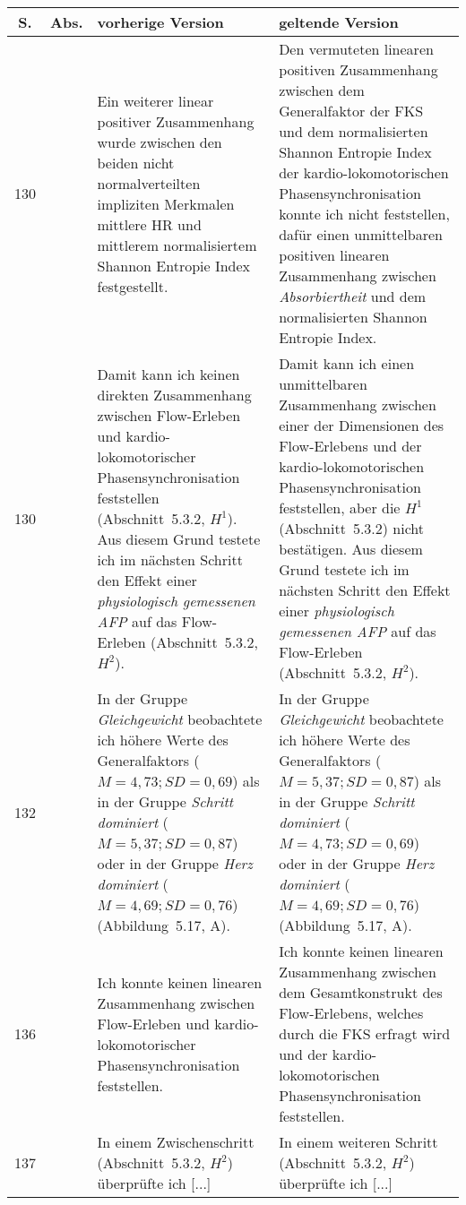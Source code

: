 \documentclass[12pt, twoside=semi, DIV=calc, pagesize, parskip=half, listof=totoc, bibliography=totoc, open=right, listof=nochaptergap, pointlessnumbers, final]{scrreprt}
\begin{document}
	\begin{tabularx}{\textwidth}{|c|c|X|X|} 
	\hline
	\textbf{S.} & \textbf{Abs.} & \textbf{vorherige Version} & \textbf{geltende Version}\\
	\hline
	\endhead
		130 & & Ein weiterer linear positiver Zusammenhang wurde zwischen den beiden nicht normalverteilten impliziten Merkmalen mittlere HR und mittlerem normalisiertem Shannon Entropie Index festgestellt. & Den vermuteten linearen positiven Zusammenhang zwischen dem Generalfaktor der FKS und dem normalisierten Shannon Entropie Index der kardio-lokomotorischen Phasensynchronisation konnte ich nicht feststellen, dafür einen unmittelbaren positiven linearen Zusammenhang zwischen \emph{Absorbiertheit} und dem normalisierten Shannon Entropie Index.\\
		\hline
		130 & & Damit kann ich keinen direkten Zusammenhang zwischen Flow-Erleben und kardio-lokomotorischer Phasensynchronisation feststellen (Abschnitt~5.3.2, $H^1$). Aus diesem Grund testete ich im nächsten Schritt den Effekt einer \emph{physiologisch gemessenen AFP} auf das Flow-Erleben (Abschnitt~5.3.2, $H^2$). & Damit kann ich einen unmittelbaren Zusammenhang zwischen einer der Dimensionen des Flow-Erlebens und der kardio-lokomotorischen Phasensynchronisation feststellen, aber die $H^1$ (Abschnitt~5.3.2) nicht bestätigen. Aus diesem Grund testete ich im nächsten Schritt den Effekt einer \emph{physiologisch gemessenen AFP} auf das Flow-Erleben (Abschnitt~5.3.2, $H^2$).\\
		\hline
		132 & & In der Gruppe \emph{Gleichgewicht} beobachtete ich höhere Werte des Generalfaktors ($M = 4{,}73; SD = 0{,}69$) als in der Gruppe \emph{Schritt dominiert} ($M = 5{,}37; SD = 0{,}87$) oder in der Gruppe \emph{Herz dominiert} ($M = 4{,}69; SD = 0{,}76$) (Abbildung~5.17, A). & In der Gruppe \emph{Gleichgewicht} beobachtete ich höhere Werte des Generalfaktors ($M = 5{,}37; SD = 0{,}87$) als in der Gruppe \emph{Schritt dominiert} ($M = 4{,}73; SD = 0{,}69$) oder in der Gruppe \emph{Herz dominiert} ($M = 4{,}69; SD = 0{,}76$) (Abbildung~5.17, A).\\
		\hline
		136 & & Ich konnte keinen linearen Zusammenhang zwischen Flow-Erleben und kardio-lokomotorischer Phasensynchronisation feststellen. & Ich konnte keinen linearen Zusammenhang zwischen dem Gesamtkonstrukt des Flow-Erlebens, welches durch die FKS erfragt wird und der kardio-lokomotorischen Phasensynchronisation feststellen.\\
		\hline
		137 & & In einem Zwischenschritt (Abschnitt~5.3.2, $H^2$) überprüfte ich [...]  & In einem weiteren Schritt (Abschnitt~5.3.2, $H^2$) überprüfte ich [...]\\

\end{tabularx}
\end{document}
